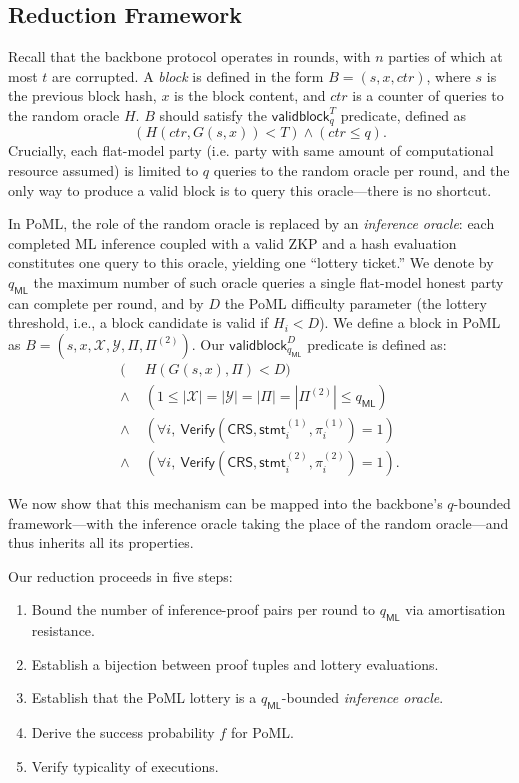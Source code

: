\subsection{Reduction Framework}

Recall that the backbone protocol operates in rounds, with $n$ parties of which at most $t$ are corrupted. A \textit{block} is defined in the form $B = (s,x,ctr)$, where $s$ is the previous block hash, $x$ is the block content, and $ctr$ is a counter of queries to the random oracle $H$. $B$ should satisfy the $\mathsf{validblock}^T_q$ predicate, defined as
\[
(H(ctr,G(s,x))<T) \wedge (ctr \leq q).
\]
Crucially, each flat-model party (i.e. party with same amount of computational resource assumed) is limited to $q$ queries to the random oracle per round, and the only way to produce a valid block is to query this oracle---there is no shortcut.

In PoML, the role of the random oracle is replaced by an \emph{inference oracle}: each completed ML inference coupled with a valid ZKP and a hash evaluation constitutes one query to this oracle, yielding one ``lottery ticket.''  We denote by $q_{\mathsf{ML}}$ the maximum number of such oracle queries a single flat-model honest party can complete per round, and by $D$ the PoML difficulty parameter (the lottery threshold, i.e., a block candidate is valid if $H_i < D$). We define a block in PoML as $B = (s, x, \mathcal{X}, \mathcal{Y}, \Pi, \Pi^{(2)})$.  Our $\mathsf{validblock}^D_{q_{\mathsf{ML}}}$ predicate is defined as:
\[
\begin{aligned}
(& H(G(s,x), \Pi) < D) \\
\wedge\;& (1 \le |\mathcal{X}| = |\mathcal{Y}| = |\Pi| = |\Pi^{(2)}| \le q_{\mathsf{ML}}) \\
\wedge\;& (\forall i,\ 
\mathsf{Verify}(\mathsf{CRS},\mathsf{stmt}_i^{(1)},\pi_i^{(1)})=1 ) \\
\wedge\;& (\forall i,\ 
\mathsf{Verify}(\mathsf{CRS},\mathsf{stmt}_i^{(2)},\pi_i^{(2)})=1 ).
\end{aligned}
\]


We now show that this mechanism can be mapped into the backbone's $q$-bounded framework---with the inference oracle taking the place of the random oracle---and thus inherits all its properties.

Our reduction proceeds in five steps:
\begin{enumerate}[nosep]
    \item Bound the number of inference-proof pairs per round to $q_{\mathsf{ML}}$ via amortisation resistance.
    \item Establish a bijection between proof tuples and lottery evaluations.
    \item Establish that the PoML lottery is a $q_{\mathsf{ML}}$-bounded \emph{inference oracle}.
    \item Derive the success probability $f$ for PoML.
    \item Verify typicality of executions.
\end{enumerate}

